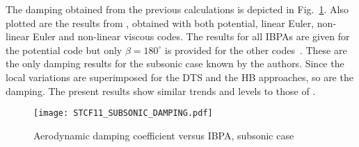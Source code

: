 The damping obtained from the previous calculations is depicted 
in Fig.~\ref{fig:stcf11_subsonic_damping}.  Also plotted are the results
from \citet{Fransson1999}, obtained with both
potential, linear Euler, non-linear Euler and non-linear viscous codes.
The results for all IBPAs are given for the potential code but only $\beta=180^\circ$ is provided for the other codes~\cite{Fransson1999}.
These are the only damping results for the
subsonic case known by the authors.  Since the local variations are
superimposed for the DTS and the HB approaches, so are the damping.
The present
results show similar trends and levels to those of \citet{Fransson1999}.
\begin{figure}[htb]
  \centering
  \texttt{[image: STCF11\_SUBSONIC\_DAMPING.pdf]}
  \caption{Aerodynamic damping coefficient versus IBPA, subsonic case}
  \label{fig:stcf11_subsonic_damping}
\end{figure}